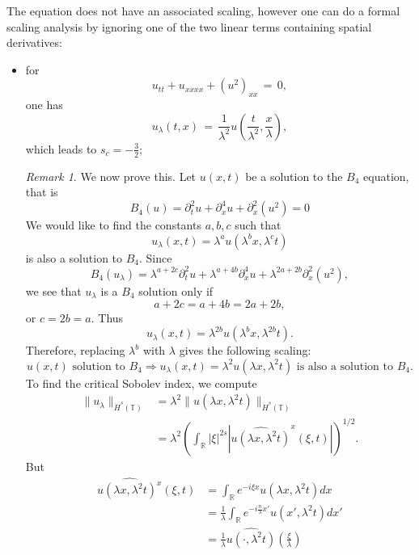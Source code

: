 \documentclass[12pt,reqno]{amsart}
\numberwithin{equation}{section}  %
\numberwithin{figure}{section}
\newcommand{\rr}{\mathbb{R}}
\newcommand{\ci}{\mathbb{T}}
\newcommand{\wh}{\widehat}
\theoremstyle{plain}
\theoremstyle{definition}
\theoremstyle{remark}
\newtheorem{remark}{Remark}
\begin{document}
The equation does not have an associated scaling, however one can do a formal scaling analysis by ignoring one of the two linear terms containing spatial derivatives:
\begin{itemize}
  \item for 
    \[
    u_{tt}+u_{xxxx}+(u^2)_{xx}\,=\,0,
    \]
    one has 
    \[
    u_{\lambda}(t,x)\,=\,\frac{1}{\lambda^2}u\left(\frac{t}{\lambda^2}, \frac{x}{\lambda}\right),
    \]
    which leads to $s_c=-\frac 32$;
\begin{framed}
\begin{remark}
We now prove this.
Let $u(x, t)$ be a solution to the $B_4$ equation, that is
%
$$
B_4(u)=
 \partial_t^2u + \partial^4_x u + \partial_x^2(u^2)  = 0
$$
%
We would like to find the constants
$a, b, c$ such that
\[
u_\lambda (x, t) = \lambda^a u(\lambda^b x, \lambda^c t)
\]
is also a solution to $B_4$.  Since 
$$
B_4(u_\lambda)=
\lambda^{a+2c} \partial_t^2u 
+
 \lambda^{a+4b} \partial^4_x u 
 +
  \lambda^{2a+2b}
  \partial_x^2(u^2),  
$$
we see that $u_\lambda$ is a $B_4$ solution only if
$$
a+2c=a+4b=2a+2b,
$$
or
$
c= 2b =a.
$
  Thus
\[
u_\lambda (x, t) = \lambda^{2b} u(\lambda^{b}x,  \lambda^{2b} t).
\]
%
%
Therefore, replacing  $ \lambda^b$ with  $ \lambda$ gives the following scaling:
%
\begin{equation}
\label{DP-scal}
\boxed{
u(x, t) \text{ solution to }  B_4
 \Longrightarrow 
u_\lambda (x, t) = \lambda^2 u(\lambda x, \lambda^2 t)  \text { is also a
solution to }  B_4. 
}
\end{equation}
  \label{rem:scaling}
To find the critical Sobolev index, we compute
%
%
\begin{equation}
\begin{split}
  \| u_{\lambda} \|_{\dot{H}^s(\ci)} 
  & = \lambda^{2} \| u(\lambda x, \lambda^2 t) \|_{\dot{H}^{s}(\ci)}
  \\
  & = \lambda^{2} \left( \int_{\rr} | \xi |^{2s} | \wh{u(\lambda x,
  \lambda^{2} t)}^x (\xi, t)| \right)^{1/2}.
\end{split}
\label{crit-ind-comp}
\end{equation}
%
But
%
%
\begin{equation*}
\begin{split}
  \wh{u(\lambda x, \lambda^{2}t)^x}(\xi, t)
  & = \int_{\rr}e^{-i\xi x}u(\lambda x, \lambda^2 t) dx
  \\
  & = \frac{1}{\lambda} \int_{\rr}e^{-i \frac{n}{\lambda} x'}u(x',
  \lambda^{2} t) dx'
  \\
  & = \frac{1}{\lambda} \wh{u(\cdot, \lambda^{2}t)}(\frac{\xi}{\lambda})

\end{split}
\end{equation*}
\end{remark}
\end{framed}
\end{itemize}
\end{document}
